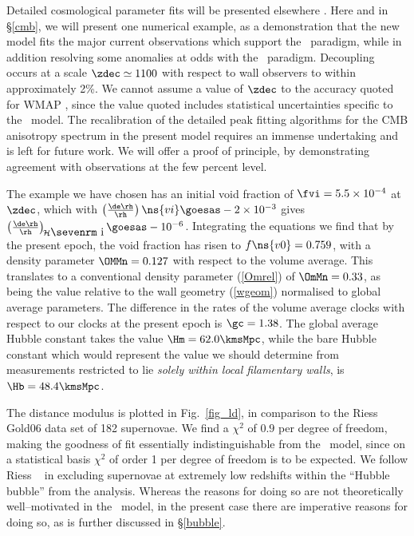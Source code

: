 \documentclass[12pt]{iopart}
\begin{document}
Detailed cosmological parameter fits will be presented elsewhere
\cite{paper2}. Here and in \S\ref{cmb}, we will present one numerical
example, as a demonstration that the new model fits the major current
observations which support the \LCDM\ paradigm, while in addition resolving
some anomalies at odds with the \LCDM\ paradigm.
Decoupling occurs at a scale $\zdec\simeq1100$ with respect to wall observers
to within approximately 2\%. We cannot assume a value of $\zdec$ to the
accuracy quoted for WMAP \cite{wmap}, since the value quoted
includes statistical uncertainties specific to the \LCDM\ model. The
recalibration of the detailed peak fitting algorithms for the CMB anisotropy
spectrum in the present model requires an immense undertaking and is left for
future work. We will offer a proof of principle, by demonstrating agreement
with observations at the few percent level.

The example we have chosen has an initial void fraction of $\fvi=5.5\times
10^{-4}$ at $\zdec$, which with $\left(\de\rh\over\rh\right)\ns{vi}\goesas
-2\times10^{-3}$ gives
$\left(\de\rh\over\rh\right)_{\!\cal H\hbox{\sevenrm i}}\goesas-10^{-6}$.
Integrating the equations we find that by the present epoch, the void
fraction has risen to $f\ns{v0}=0.759$, with a density parameter
$\OMMn=0.127$ with respect to the volume average. This translates to
a conventional density parameter (\ref{Omrel}) of $\OmMn=0.33$, as
being the value relative to the wall geometry (\ref{wgeom}) normalised
to global average parameters. The difference in the rates of
the volume average clocks with respect to our clocks at the present
epoch is $\gc=1.38$. The global average Hubble constant takes the value
$\Hm=62.0\kmsMpc$, while the bare Hubble constant which would represent
the value we should determine from measurements restricted to lie
{\em solely within local filamentary walls}, is $\Hb=48.4\kmsMpc$.

The distance modulus is plotted in Fig.\ \ref{fig_ld}, in comparison to
the Riess Gold06 data set \cite{Riess06} of 182 supernovae. We find
a $\chi^2$ of $0.9$ per degree of freedom, making the goodness of fit
essentially indistinguishable from the \LCDM\ model, since on a statistical
basis $\chi^2$ of order 1 per degree of freedom is to be expected.
We follow Riess \etal\ \cite{Riess06} in excluding supernovae at extremely
low redshifts within the ``Hubble bubble'' from the analysis. Whereas the
reasons for doing so are not theoretically well--motivated in the \LCDM\
model, in the present case there are imperative reasons for doing so,
as is further discussed in \S\ref{bubble}.
\end{document}
